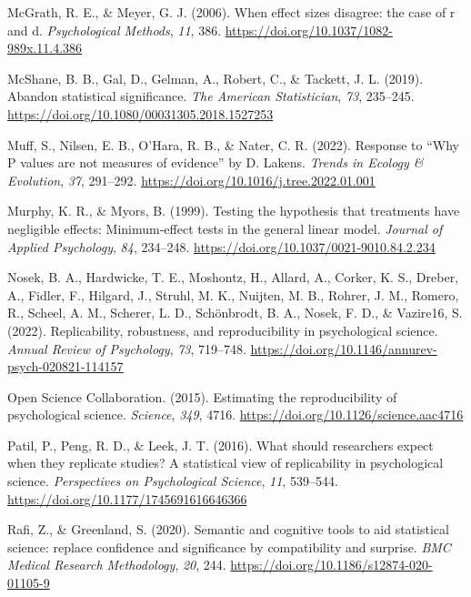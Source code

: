 \documentclass[]{cik}%
\newlength{\cslhangindent}
\newlength{\cslentryspacingunit} %
\newenvironment{CSLReferences}[2] %
 {%
  \setlength{\parindent}{0pt}
  \ifodd #1
  \let\oldpar\par
  \def\par{\hangindent=\cslhangindent\oldpar}
  \fi
  \setlength{\parskip}{#2\cslentryspacingunit}
 }%
 {}
\begin{document}
\begin{CSLReferences}{1}{0}
\leavevmode{}%
McGrath, R. E., \& Meyer, G. J. (2006). When effect sizes disagree: the
case of r and d. \emph{Psychological Methods}, \emph{11}, 386.
\url{https://doi.org/10.1037/1082-989x.11.4.386}

\leavevmode{}%
McShane, B. B., Gal, D., Gelman, A., Robert, C., \& Tackett, J. L.
(2019). Abandon statistical significance. \emph{The American
Statistician}, \emph{73}, 235--245.
\url{https://doi.org/10.1080/00031305.2018.1527253}

\leavevmode{}%
Muff, S., Nilsen, E. B., O'Hara, R. B., \& Nater, C. R. (2022). Response
to {``Why P values are not measures of evidence''} by D. Lakens.
\emph{Trends in Ecology \& Evolution}, \emph{37}, 291--292.
\url{https://doi.org/10.1016/j.tree.2022.01.001}

\leavevmode{}%
Murphy, K. R., \& Myors, B. (1999). Testing the hypothesis that
treatments have negligible effects: Minimum-effect tests in the general
linear model. \emph{Journal of Applied Psychology}, \emph{84}, 234--248.
\url{https://doi.org/10.1037/0021-9010.84.2.234}

\leavevmode{}%
Nosek, B. A., Hardwicke, T. E., Moshontz, H., Allard, A., Corker, K. S.,
Dreber, A., Fidler, F., Hilgard, J., Struhl, M. K., Nuijten, M. B.,
Rohrer, J. M., Romero, R., Scheel, A. M., Scherer, L. D., Schönbrodt, B.
A., Nosek, F. D., \& Vazire16, S. (2022). Replicability, robustness, and
reproducibility in psychological science. \emph{Annual Review of
Psychology}, \emph{73}, 719--748.
\url{https://doi.org/10.1146/annurev-psych-020821-114157}

\leavevmode{}%
Open Science Collaboration. (2015). Estimating the reproducibility of
psychological science. \emph{Science}, \emph{349}, 4716.
\url{https://doi.org/10.1126/science.aac4716}

\leavevmode{}%
Patil, P., Peng, R. D., \& Leek, J. T. (2016). What should researchers
expect when they replicate studies? A statistical view of replicability
in psychological science. \emph{Perspectives on Psychological Science},
\emph{11}, 539--544. \url{https://doi.org/10.1177/1745691616646366}

\leavevmode{}%
Rafi, Z., \& Greenland, S. (2020). Semantic and cognitive tools to aid
statistical science: replace confidence and significance by
compatibility and surprise. \emph{BMC Medical Research Methodology},
\emph{20}, 244. \url{https://doi.org/10.1186/s12874-020-01105-9}


\end{CSLReferences}
\end{document}
